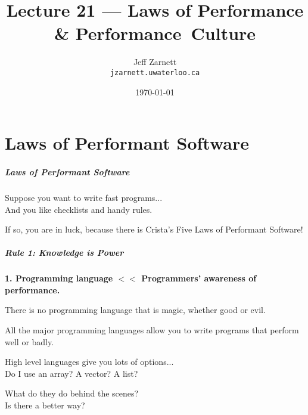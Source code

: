 

\title{Lecture 21 --- Laws of Performance \& Performance~Culture }

\author{Jeff Zarnett \\ \small \texttt{jzarnett.uwaterloo.ca}}
\date{\today}




\begin{frame}
  \titlepage

 \end{frame}


\part{Laws of Performant Software}

\begin{frame}
\partpage
\end{frame}


\begin{frame}
\frametitle{Laws of Performant Software}

Suppose you want to write fast programs...\\
\quad And you like checklists and handy rules. 

If so, you are in luck, because there is Crista's Five Laws of Performant Software!

\end{frame}



\begin{frame}
\frametitle{Rule 1: Knowledge is Power}

\textbf{1. Programming language $<<$ Programmers' awareness of performance.}

There is no programming language that is magic, whether good or evil. 

All the major programming languages allow you to write programs that perform well or badly. 

High level languages give you lots of options...\\
\quad Do I use an array? A vector? A list? 

What do they do behind the scenes?\\
\quad Is there a better way?

\end{frame}



